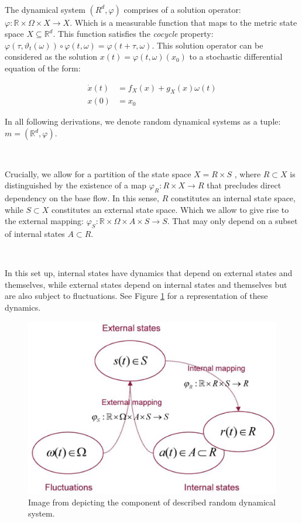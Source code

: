 \documentclass{article}
\newcommand{\R}{\mathbb{R}}
\begin{document}
\

The dynamical system $(R^d, \varphi)$ comprises of a solution operator: $\varphi: \R \times \Omega \times X \to X$. Which is a measurable function that maps to the metric state space $X \subseteq \mathbb{R}^d$. This function satisfies the \textit{cocycle} property: $\varphi(\tau, \vartheta_t(\omega)) \circ \varphi(t, \omega) = \varphi(t + \tau, \omega)$. This solution operator can be considered as the solution $x(t) = \varphi(t, \omega)(x_0)$ to a stochastic differential equation of the form:

\begin{equation}
	\begin{aligned}
		\dot{x}(t) &= f_X(x) + g_X(x)\omega(t) \\
		x(0) &= x_0
	\end{aligned}
\end{equation}

In all following derivations, we denote random dynamical systems as a tuple: $m = (\R^d, \varphi)$.

\

Crucially, we allow for a partition of the state space $X = R \times S$ , where $R \subset X$ is distinguished by  the existence of a map $\varphi_R : R \times X \to R$ that precludes direct dependency on the base flow. In this  sense, $R$ constitutes an internal state space, while $S \subset X$ constitutes an external state space. Which we allow to give rise to the external mapping: $\varphi_S: \R \times \Omega \times A \times S \to S$. That may only depend on a subset of internal states $A \subset R$. 

\

In this set up, internal states have dynamics that depend on external states and themselves, while external states depend on internal states and themselves but are also subject to fluctuations. See Figure \ref{fig:random_dynamical_system} for a representation of these dynamics.

\begin{figure}[htbp]
    \centering
    \includegraphics[scale=0.55]{images/random_dynamical_system.png}
    \caption{Image from \citet{friston2012free} depicting the component of described random dynamical system.}
    \label{fig:random_dynamical_system}
\end{figure}
\end{document}
